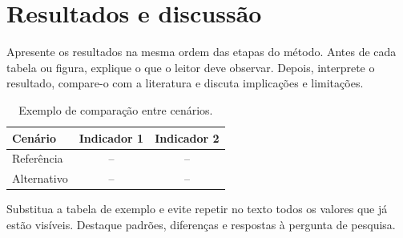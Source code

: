 \section{Resultados e discussão}
\label{sec:resultados}

Apresente os resultados na mesma ordem das etapas do método. Antes de cada
tabela ou figura, explique o que o leitor deve observar. Depois, interprete o
resultado, compare-o com a literatura e discuta implicações e limitações.


\begin{table}[htbp]
  \centering
  \caption{Exemplo de comparação entre cenários.}
  \label{tab:cenarios}
  \begin{tabular}{lcc}
    \toprule
    Cenário & Indicador 1 & Indicador 2 \\
    \midrule
    Referência & -- & -- \\
    Alternativo & -- & -- \\
    \bottomrule
  \end{tabular}
\end{table}

Substitua a tabela de exemplo e evite repetir no texto todos os valores que já
estão visíveis. Destaque padrões, diferenças e respostas à pergunta de pesquisa.
